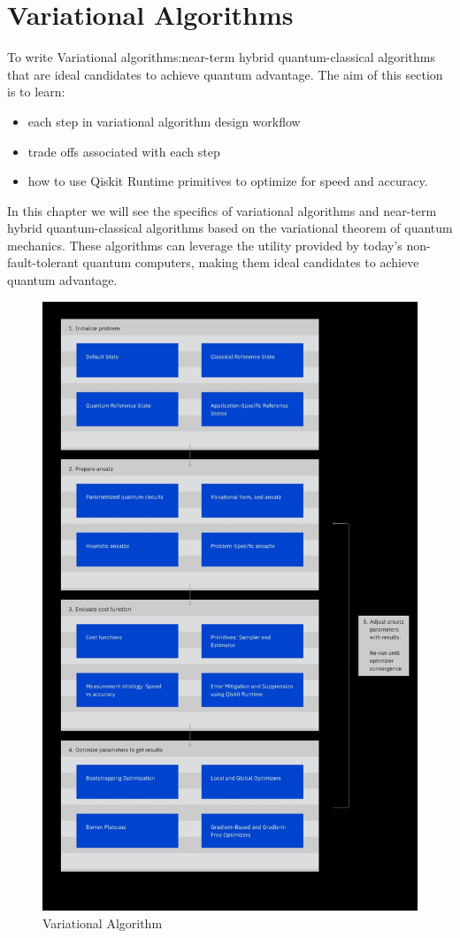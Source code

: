 \documentclass[12pt, oneside]{book}
\theoremstyle{definition}
\theoremstyle{definition}
\theoremstyle{remark}
\begin{document}
\chapter{Variational Algorithms}
To write Variational algorithms:near-term hybrid quantum-classical algorithms that are ideal candidates to achieve quantum advantage. 
The aim of this section is to learn:
\begin{itemize}
    \item each step in variational algorithm design workflow
    \item trade offs associated with each step
    \item how to use Qiskit Runtime primitives to optimize for speed and accuracy.
\end{itemize}

In this chapter we will see the specifics of variational algorithms and near-term hybrid quantum-classical algorithms based on the variational theorem of quantum mechanics. These algorithms can leverage the utility provided by today's non-fault-tolerant quantum computers, making them ideal candidates to achieve quantum advantage.

\begin{figure}
    \centering
    \includegraphics[width=0.75\linewidth]{../images/VQE_algo.png}
    \caption{Variational Algorithm}
    \label{figvqe_algo}
\end{figure}
\end{document}
